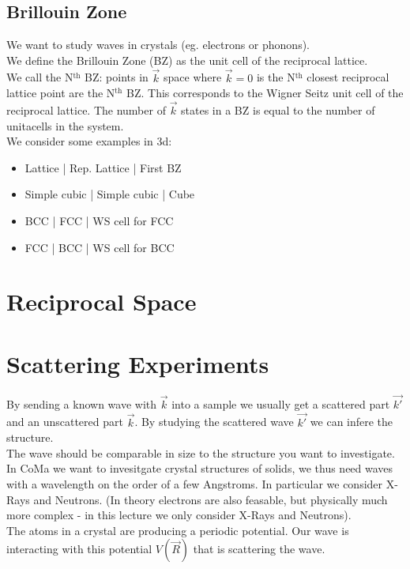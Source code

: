 \documentclass{report}
\begin{document}
\section{Brillouin Zone}
We want to study waves in crystals (eg. electrons or phonons). \\
We define the Brillouin Zone (BZ) as the unit cell of the reciprocal lattice. \\
We call the N$^{\text{th}}$ BZ: points in $\vec{k}$ space where $\vec{k} = 0$ is the N$^{\text{th}}$ closest reciprocal lattice point are the N$^{\text{th}}$ BZ. This corresponds to the Wigner Seitz unit cell of the reciprocal lattice.
The number of $\vec{k}$ states in a BZ is equal to the number of unitacells in the system. \\
We consider some examples in 3d:\\
\begin{itemize}
	\item Lattice		| Rep. Lattice 	| First BZ
	\item Simple cubic 	| Simple cubic 	| Cube
	\item BCC		| FCC		| WS cell for FCC
	\item FCC		| BCC		| WS cell for BCC
\end{itemize}
\chapter{Reciprocal Space}
\chapter{Scattering Experiments}
By sending a known wave with $\vec{k}$ into a sample we usually get a scattered part $\vec{k'}$ and an unscattered part $\vec{k}$. By studying the scattered wave $\vec{k'}$ we can infere the structure.\\
The wave should be comparable in size to the structure you want to investigate.  In CoMa we want to invesitgate crystal structures of solids, we thus need waves with a wavelength on the order of a few Angstroms. In particular we consider X-Rays and Neutrons. (In theory electrons are also feasable, but physically much more complex - in this lecture we only consider X-Rays and Neutrons).\\
The atoms in a crystal are producing a periodic potential. Our wave is interacting  with this potential $V(\vec{R})$ that is scattering the wave.\\
\end{document}
